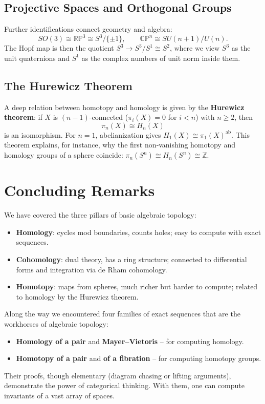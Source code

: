 \documentclass{article}
\theoremstyle{definition}
\begin{document}
\subsection{Projective Spaces and Orthogonal Groups}
Further identifications connect geometry and algebra:
\[
SO(3) \cong \mathbb{RP}^3 \cong S^3 / \{\pm 1\},\qquad
\mathbb{CP}^n \cong SU(n+1)/U(n).
\]
The Hopf map is then the quotient $S^3 \to S^3/S^1 \cong S^2$, where we view $S^3$ as the unit quaternions and $S^1$ as the complex numbers of unit norm inside them.

\subsection{The Hurewicz Theorem}
A deep relation between homotopy and homology is given by the \textbf{Hurewicz theorem}:
if $X$ is $(n-1)$-connected ($\pi_i(X)=0$ for $i<n$) with $n\ge 2$, then
\[
\pi_n(X) \cong H_n(X)
\]
is an isomorphism. For $n=1$, abelianization gives $H_1(X) \cong \pi_1(X)^{\text{ab}}$.
This theorem explains, for instance, why the first non‑vanishing homotopy and homology groups of a sphere coincide: $\pi_n(S^n) \cong H_n(S^n) \cong \mathbb{Z}$.

\section{Concluding Remarks}
We have covered the three pillars of basic algebraic topology:
\begin{itemize}
    \item \textbf{Homology}: cycles mod boundaries, counts holes; easy to compute with exact sequences.
    \item \textbf{Cohomology}: dual theory, has a ring structure; connected to differential forms and integration via de Rham cohomology.
    \item \textbf{Homotopy}: maps from spheres, much richer but harder to compute; related to homology by the Hurewicz theorem.
\end{itemize}

Along the way we encountered four families of exact sequences that are the workhorses of algebraic topology:
\begin{itemize}
    \item \textbf{Homology of a pair} and \textbf{Mayer–Vietoris} – for computing homology.
    \item \textbf{Homotopy of a pair} and \textbf{of a fibration} – for computing homotopy groups.
\end{itemize}
Their proofs, though elementary (diagram chasing or lifting arguments), demonstrate the power of categorical thinking. With them, one can compute invariants of a vast array of spaces.
\end{document}
